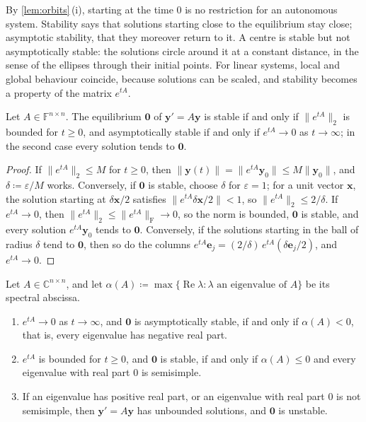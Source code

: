 By \cref{lem:orbits}\,(i), starting at the time $0$ is no restriction for an autonomous system. Stability says that solutions starting close to the equilibrium stay close; asymptotic stability, that they moreover return to it. A centre is stable but not asymptotically stable: the solutions circle around it at a constant distance, in the sense of the ellipses through their initial points. For linear systems, local and global behaviour coincide, because solutions can be scaled, and stability becomes a property of the matrix $e^{tA}$.

\begin{proposition}
\label{prop:stability-exponential}
Let $A\in\mathbb F^{n\times n}$. The equilibrium $\mathbf 0$ of $\mathbf y'=A\mathbf y$ is stable if and only if $\|e^{tA}\|_2$ is bounded for $t\ge0$, and asymptotically stable if and only if $e^{tA}\to0$ as $t\to\infty$; in the second case every solution tends to $\mathbf 0$.
\end{proposition}

\begin{proof}
If $\|e^{tA}\|_2\le M$ for $t\ge0$, then $\|\mathbf y(t)\|=\|e^{tA}\mathbf y_0\|\le M\|\mathbf y_0\|$, and $\delta\coloneqq\varepsilon/M$ works. Conversely, if $\mathbf 0$ is stable, choose $\delta$ for $\varepsilon=1$; for a unit vector $\mathbf x$, the solution starting at $\delta\mathbf x/2$ satisfies $\|e^{tA}\delta\mathbf x/2\|<1$, so $\|e^{tA}\|_2\le2/\delta$. If $e^{tA}\to0$, then $\|e^{tA}\|_2\le\|e^{tA}\|_{\mathrm F}\to0$, so the norm is bounded, $\mathbf 0$ is stable, and every solution $e^{tA}\mathbf y_0$ tends to $\mathbf 0$. Conversely, if the solutions starting in the ball of radius $\delta$ tend to $\mathbf 0$, then so do the columns $e^{tA}\mathbf e_j=(2/\delta)\,e^{tA}(\delta\mathbf e_j/2)$, and $e^{tA}\to0$.
\end{proof}

\begin{theorem}
\label{thm:linear-stability}
Let $A\in\mathbb C^{n\times n}$, and let $\alpha(A)\coloneqq\max\{\operatorname{Re}\lambda:\lambda\text{ an eigenvalue of }A\}$ be its spectral abscissa.
\begin{enumerate}
\item $e^{tA}\to0$ as $t\to\infty$, and $\mathbf 0$ is asymptotically stable, if and only if $\alpha(A)<0$, that is, every eigenvalue has negative real part.
\item $e^{tA}$ is bounded for $t\ge0$, and $\mathbf 0$ is stable, if and only if $\alpha(A)\le0$ and every eigenvalue with real part $0$ is semisimple.
\item If an eigenvalue has positive real part, or an eigenvalue with real part $0$ is not semisimple, then $\mathbf y'=A\mathbf y$ has unbounded solutions, and $\mathbf 0$ is unstable.
\end{enumerate}
\end{theorem}

